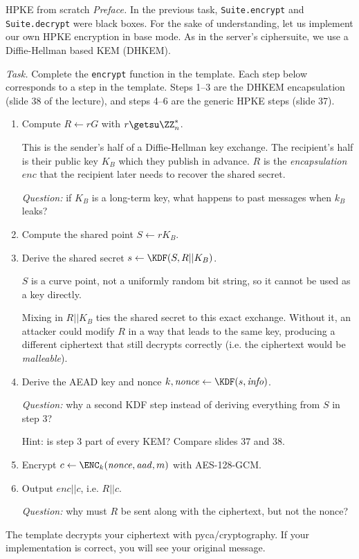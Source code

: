 \documentclass{practice}
\begin{document}
\begin{task}{HPKE from scratch}
  \textit{Preface.}
  In the previous task, \texttt{Suite.encrypt} and \texttt{Suite.decrypt} were black boxes.
  For the sake of understanding, let us implement our own HPKE encryption in base mode.
  As in the server's ciphersuite, we use a Diffie-Hellman based KEM (DHKEM).

  \textit{Task.}
  Complete the \texttt{encrypt} function in the template.
  Each step below corresponds to a step in the template.
  Steps 1--3 are the DHKEM encapsulation (slide 38 of the lecture), and steps 4--6 are the generic HPKE steps (slide 37).
  \begin{enumerate}
    \item Compute $R \gets rG$ with $r \getsu \ZZ_n^*$.

    This is the sender's half of a Diffie-Hellman key exchange.
    The recipient's half is their public key $K_B$ which they publish in advance.
    $R$ is the \emph{encapsulation} $\mathit{enc}$ that the recipient later needs to recover the shared secret.

    \textit{Question:} if $K_B$ is a long-term key, what happens to past messages when $k_B$ leaks?

    \item Compute the shared point $S \gets rK_B$.

    \item Derive the shared secret $s \gets \KDF(S, R||K_B)$.

    $S$ is a curve point, not a uniformly random bit string, so it cannot be used as a key directly.
    
    Mixing in $R||K_B$ ties the shared secret to this exact exchange.
    Without it, an attacker could modify $R$ in a way that leads to the same key, producing a different ciphertext that still decrypts correctly (i.e. the ciphertext would be \emph{malleable}).

    \item Derive the AEAD key and nonce $k, \mathit{nonce} \gets \KDF(s, \mathit{info})$.

    \textit{Question:} why a second KDF step instead of deriving everything from $S$ in step 3?
    
    Hint: is step 3 part of every KEM?
    Compare slides 37 and 38.

    \item Encrypt $c \gets \ENC_k(\mathit{nonce}, \mathit{aad}, m)$ with AES-128-GCM.

    \item Output $\mathit{enc}||c$, i.e. $R||c$.

    \textit{Question:} why must $R$ be sent along with the ciphertext, but not the nonce?
  \end{enumerate}

  The template decrypts your ciphertext with pyca/cryptography.
  If your implementation is correct, you will see your original message.
\end{task}
\end{document}
